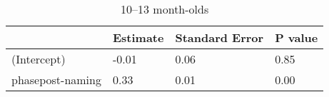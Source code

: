 


\begin{table}[tbp]

\begin{center}
\begin{threeparttable}

\caption{\label{tab:r2-cn-prepost-glmers-agegroup-tabs}10--13 month-olds}

\begin{tabular}{llll}
\toprule
 & \multicolumn{1}{c}{Estimate} & \multicolumn{1}{c}{Standard Error} & \multicolumn{1}{c}{P value}\\
\midrule
(Intercept) & -0.01 & 0.06 & 0.85\\
phasepost-naming & 0.33 & 0.01 & 0.00\\
\bottomrule
\end{tabular}

\end{threeparttable}
\end{center}

\end{table}



